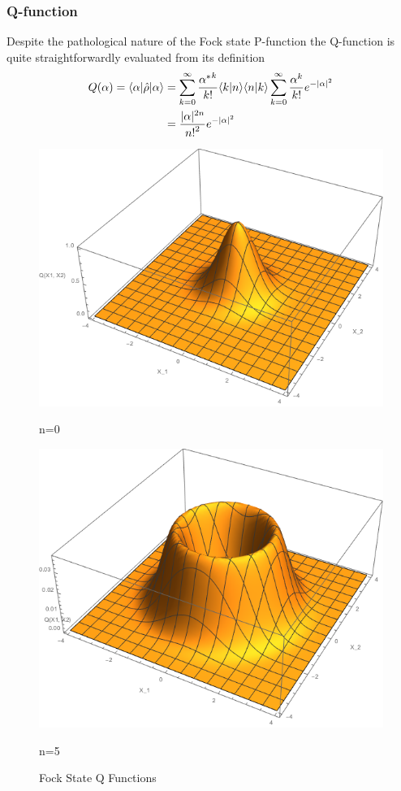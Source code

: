 \subsubsection{Q-function}
Despite the pathological nature of the Fock state P-function the Q-function is quite straightforwardly evaluated from its definition
\begin{align}
	 Q(\alpha) = \langle\alpha | \hat{\rho} | \alpha \rangle  &= \sum_{k=0}^\infty \frac {{\alpha^*}^k}{k!} \langle k | n \rangle\langle n | k \rangle \sum_{k=0}^\infty \frac {\alpha^k}{k!}e^{-|\alpha|^2} \\ &= \frac{|\alpha|^{2n}}{{n!}^2} e^{-|\alpha|^2}
\end{align}
\begin{figure}[h]
	\begin{minipage}[b]{.5\linewidth}
		\centering \large \includegraphics[width=1\textwidth]{Images/Q Function-n=0.png}
		\caption{n=0}\label{fig:Qn=0}
	\end{minipage}%
	\begin{minipage}[b]{.5\linewidth}
		\centering\large \includegraphics[width = 1\textwidth]{Images/Q Function-n=3.png}
		\caption{n=5}\label{fig:Qn=5}
	\end{minipage}
	\caption{Fock State Q Functions}\label{Qfunctions}
\end{figure}
